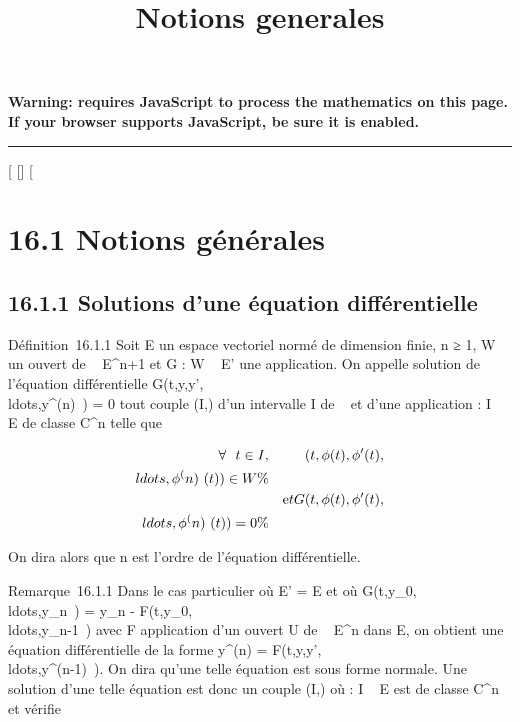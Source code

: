 \documentclass[]{article}
\title{Notions generales}
\author{}
\date{}
\begin{document}
\maketitle

\textbf{Warning: 
requires JavaScript to process the mathematics on this page.\\ If your
browser supports JavaScript, be sure it is enabled.}

\begin{center}\rule{3in}{0.4pt}\end{center}

[
[]
[

\section{16.1 Notions générales}

\subsection{16.1.1 Solutions d'une équation différentielle}

Définition~16.1.1 Soit E un espace vectoriel normé de dimension finie, n
≥ 1, W un ouvert de ~ \times E^n+1 et G : W \rightarrow~ E' une application.
On appelle solution de l'équation différentielle
G(t,y,y',\\ldots,y^(n)~)
= 0 tout couple (I,\phi) d'un intervalle I de ~ et d'une application \phi : I
\rightarrow~ E de classe C^n telle que

\begin{align*} \forall~~t \in I,&
&
(t,\phi(t),\phi'(t),\\ldots,\phi^(n)~(t))
\in W \%& \\ & & \text
et
G(t,\phi(t),\phi'(t),\\ldots,\phi^(n)~(t))
= 0\%& \\
\end{align*}

On dira alors que n est l'ordre de l'équation différentielle.

Remarque~16.1.1 Dans le cas particulier où E' = E et où
G(t,y_0,\\ldots,y_n~)
= y_n -
F(t,y_0,\\ldots,y_n-1~)
avec F application d'un ouvert U de ~ \times E^n dans E, on
obtient une équation différentielle de la forme y^(n) =
F(t,y,y',\\ldots,y^(n-1)~).
On dira qu'une telle équation est sous forme normale. Une solution d'une
telle équation est donc un couple (I,\phi) où \phi : I \rightarrow~ E est de classe
C^n et vérifie
\end{document}
